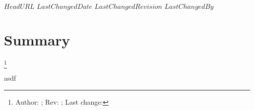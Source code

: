 \svnidlong
{$HeadURL$}
{$LastChangedDate$}
{$LastChangedRevision$}
{$LastChangedBy$}

\section{Summary}
\footnote{Author: \svnauthor; Rev: \svnrev; Last change: \svndate}%

asdf
